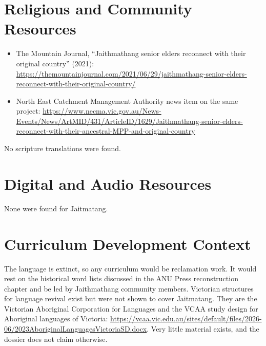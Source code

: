 \documentclass[12pt]{article}
\begin{document}
\section{Religious and Community Resources}
\begin{itemize}
\item The Mountain Journal, ``Jaithmathang senior elders reconnect with their original country'' (2021): \url{https://themountainjournal.com/2021/06/29/jaithmathang-senior-elders-reconnect-with-their-original-country/}
\item North East Catchment Management Authority news item on the same project: \url{https://www.necma.vic.gov.au/News-Events/News/ArtMID/431/ArticleID/1629/Jaithmathang-senior-elders-reconnect-with-their-ancestral-MPP-and-original-country}
\end{itemize}
No scripture translations were found.

\section{Digital and Audio Resources}
None were found for Jaitmatang.

\section{Curriculum Development Context}
The language is extinct, so any curriculum would be reclamation work. It would rest on the historical word lists discussed in the ANU Press reconstruction chapter and be led by Jaithmathang community members. Victorian structures for language revival exist but were not shown to cover Jaitmatang. They are the Victorian Aboriginal Corporation for Languages and the VCAA study design for Aboriginal languages of Victoria: \url{https://vcaa.vic.edu.au/sites/default/files/2026-06/2023AboriginalLanguagesVictoriaSD.docx}. Very little material exists, and the dossier does not claim otherwise.
\end{document}
